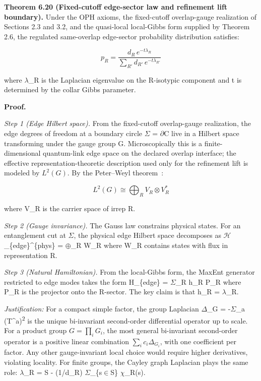 \textbf{Theorem 6.20 (Fixed-cutoff edge-sector law and refinement lift boundary).} Under the OPH
axioms, the fixed-cutoff overlap-gauge realization of Sections 2.3 and 3.2, and the quasi-local
local-Gibbs form supplied by Theorem 2.6, the regulated same-overlap edge-sector probability
distribution satisfies:

\[
p_R = \frac{d_R \, e^{-t \lambda_R}}{\sum_{R'} d_{R'} \, e^{-t \lambda_{R'}}}
\]

where \ensuremath{\lambda}\_R is the Laplacian eigenvalue on the R-isotypic component and t is determined by the collar Gibbs parameter.

\textbf{Proof.}

\emph{Step 1 (Edge Hilbert space).} From the fixed-cutoff overlap-gauge realization, the edge
degrees of freedom at a boundary circle \ensuremath{\Sigma} = \ensuremath{\partial}C live in a
Hilbert space transforming under the gauge group G. Microscopically this is a finite-dimensional
quantum-link edge space on the declared overlap interface; the effective
representation-theoretic description used only for the refinement lift is modeled by \(L^2(G)\).
By the Peter--Weyl theorem~\cite{peterWeyl27}:

\[
L^2(G) \cong \bigoplus_R V_R \otimes V_R^*
\]

where V\_R is the carrier space of irrep R.

\emph{Step 2 (Gauge invariance).} The Gauss law constrains physical states. For an entanglement cut at \ensuremath{\Sigma}, the physical edge Hilbert space decomposes as \ensuremath{\mathcal{H}}\_\{edge\}\^{}\{phys\} = \ensuremath{\oplus}\_R W\_R where W\_R contains states with flux in representation R.

\emph{Step 3 (Natural Hamiltonian).} From the local-Gibbs form, the MaxEnt generator restricted to edge modes takes the form H\_\{edge\} = \ensuremath{\Sigma}\_R h\_R P\_R where P\_R is the projector onto the R-sector. The key claim is that h\_R = \ensuremath{\lambda}\_R.

\emph{Justification:} For a compact simple factor, the group Laplacian \ensuremath{\Delta}\_G = -\ensuremath{\Sigma}\_a (T\^{}a)\textsuperscript{2} is the unique bi-invariant second-order differential operator up to scale. For a product group \(G=\prod_i G_i\), the most general bi-invariant second-order operator is a positive linear combination \(\sum_i c_i \Delta_{G_i}\), with one coefficient per factor. Any other gauge-invariant local choice would require higher derivatives, violating locality. For finite groups, the Cayley graph Laplacian plays the same role: \ensuremath{\lambda}\_R = \textbar S\textbar{} - (1/d\_R) \ensuremath{\Sigma}\_\{s\ensuremath{\in}S\} \ensuremath{\chi}\_R(s).

